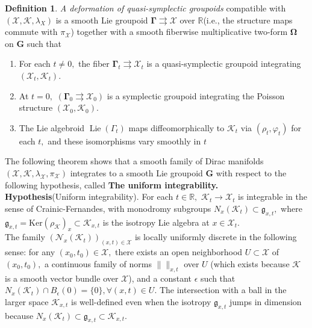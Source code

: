 \documentclass[reqno]{amsart}
\theoremstyle{plain}
\theoremstyle{definition}
\newtheorem{Def}[Thm]{Definition}
\newcommand{\R}{\mathbb{R}}
\newcommand{\g}{\mathfrak{g}}
\newcommand{\too}{\longrightarrow}
\newcommand{\N}{\mathcal{N}}
\newcommand{\X}{\mathcal{X}}
\newcommand{\Ker}{\text{Ker}}
\newcommand{\K}{\mathcal{K}}
\newcommand{\Lie}{\operatorname{Lie}}
\begin{document}
\begin{Def} \label{def:family}
    \textit{A deformation of quasi-symplectic groupoids} compatible with $(\X,\K,\lambda_{X})$ is a smooth Lie groupoid $\mathbf{\Gamma} \rightrightarrows \X$ over $\R$(i.e., the structure maps commute with $\pi_\X$) together with a smooth fiberwise multiplicative two-form $\mathbf{\Omega}$ on $\mathbf{G}$ such that \begin{enumerate}
        \item For each $t\neq 0,$ the fiber $\mathbf{\Gamma}_t \rightrightarrows \X_t$ is a quasi-symplectic groupoid integrating $(\X_t,\K_t).$
        \item At $t = 0,$ $(\mathbf{\Gamma}_0\rightrightarrows \X_0)$ is a symplectic groupoid integrating the Poisson structure $(\X_0,\K_0).$
        \item The Lie algebroid $\Lie(\Gamma_t)$ maps diffeomorphically to $\K_t$ via $(\rho_t,\varphi_t)$ for each $t,$ and these isomorphisms vary smoothly in $t$
    \end{enumerate}
\end{Def}


The following theorem shows that a smooth family of Dirac manifolds $(\X,\K,\lambda_\X,\pi_{\X})$ integrates to a smooth Lie groupoid $\mathbf{G}$ with respect to the following hypothesis, called \textbf{The uniform integrability.}\\

\noindent\textbf{Hypothesis}(Uniform integrability). \label{Uniform inte} For each $t\in \R,$ $\K_t \too \X_t$ is integrable in the sense of Crainic-Fernandes, with monodromy subgroups $N_{x}(\K_t)\subset \g_{x,t},$ where $\g_{x,t} = \Ker(\rho_{\K})_x  \subset \K_{x,t}$ is the isotropy Lie algebra at $x\in \X_t.$\\
The family $(\N_{x}(\K_t))_{(x,t)\in \X }$ is locally uniformly discrete in the following sense: for any $(x_0,t_0) \in \X,$ there exists an open neighborhood $U\subset \X$ of $(x_0,t_0),$ a continuous family of norms $\|\|_{x,t}$ over $U$ (which exists because $\K$ is a smooth vector bundle over $\X$), and a constant $\epsilon$ such that $N_{x}(\K_t) \cap B_{\epsilon}(0) = \{0\}, \forall (x,t)\in U.$ The intersection with a ball in the larger space $\K_{x,t}$ is well-defined even when the isotropy $\g_{x,t}$ jumps in dimension because $N_{x}(\K_t) \subset \g_{x,t} \subset \K_{x,t}.$
\end{document}
